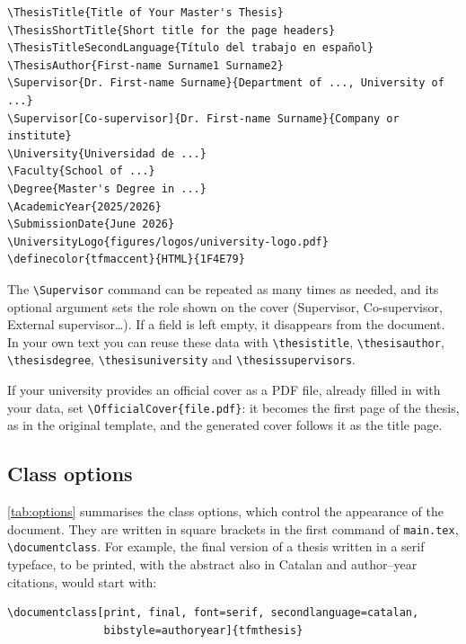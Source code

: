 \begin{lstlisting}[language={[LaTeX]TeX}, caption={Main fields of \texttt{config.tex}.}, label=lst:config]
\ThesisTitle{Title of Your Master's Thesis}
\ThesisShortTitle{Short title for the page headers}
\ThesisTitleSecondLanguage{Título del trabajo en español}
\ThesisAuthor{First-name Surname1 Surname2}
\Supervisor{Dr. First-name Surname}{Department of ..., University of ...}
\Supervisor[Co-supervisor]{Dr. First-name Surname}{Company or institute}
\University{Universidad de ...}
\Faculty{School of ...}
\Degree{Master's Degree in ...}
\AcademicYear{2025/2026}
\SubmissionDate{June 2026}
\UniversityLogo{figures/logos/university-logo.pdf}
\definecolor{tfmaccent}{HTML}{1F4E79}
\end{lstlisting}

The \texttt{\textbackslash Supervisor} command can be repeated as many times as needed, and
its optional argument sets the role shown on the cover (Supervisor, Co-supervisor, External
supervisor\dots). If a field is left empty, it disappears from the document. In your own
text you can reuse these data with \texttt{\textbackslash thesistitle},
\texttt{\textbackslash thesisauthor}, \texttt{\textbackslash thesisdegree},
\texttt{\textbackslash thesisuniversity} and \texttt{\textbackslash thesissupervisors}.

If your university provides an official cover as a PDF file, already filled in with your
data, set \texttt{\textbackslash OfficialCover\{file.pdf\}}: it becomes the first page of
the thesis, as in the original template, and the generated cover follows it as the title
page.

\subsection{Class options}\label{sec:options}

\autoref{tab:options} summarises the class options, which control the appearance of the
document. They are written in square brackets in the first command of \texttt{main.tex},
\texttt{\textbackslash documentclass}. For example, the final version of a thesis written in a serif
typeface, to be printed, with the abstract also in Catalan and author--year citations,
would start with:

\begin{lstlisting}[language={[LaTeX]TeX}, caption={Example of class options.}, label=lst:options]
\documentclass[print, final, font=serif, secondlanguage=catalan,
               bibstyle=authoryear]{tfmthesis}
\end{lstlisting}

